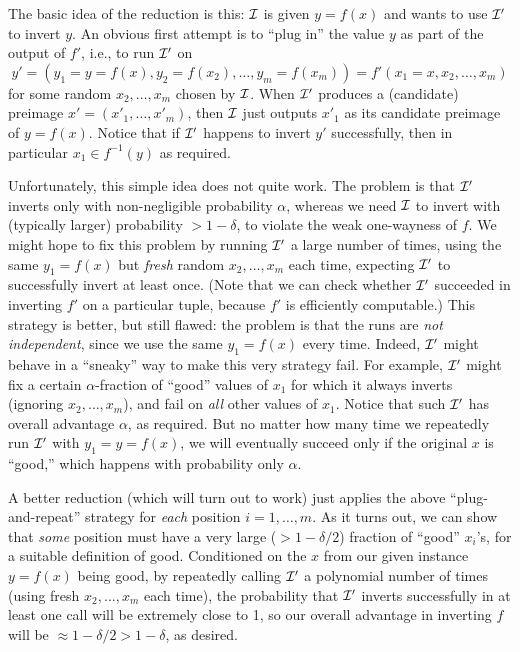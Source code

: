 \documentclass[11pt]{article}
\begin{document}
The basic idea of the reduction is this: $\mathcal{I}$ is given $y = f(x)$
and wants to use $\mathcal{I}'$ to invert $y$.  An obvious first attempt is
to ``plug in'' the value $y$ as part of the output of $f'$, i.e., to
run $\mathcal{I}'$ on \[ y' = (y_{1} = y = f(x), y_{2} = f(x_{2}), \ldots,
y_{m} = f(x_{m})) = f'(x_{1} = x, x_{2}, \ldots, x_{m}) \] for some
random $x_{2}, \ldots, x_{m}$ chosen by $\mathcal{I}$.  When $\mathcal{I}'$ produces
a (candidate) preimage $x'=(x'_{1},\ldots,x'_{m})$, then $\mathcal{I}$ just
outputs $x'_{1}$ as its candidate preimage of $y=f(x)$.  Notice that
if $\mathcal{I}'$ happens to invert $y'$ successfully, then in particular
$x_{1} \in f^{-1}(y)$ as required.

Unfortunately, this simple idea does not quite work.  The problem is
that $\mathcal{I}'$ inverts only with non-negligible probability $\alpha$,
whereas we need $\mathcal{I}$ to invert with (typically larger) probability
$> 1-\delta$, to violate the weak one-wayness of $f$.  We might hope
to fix this problem by running $\mathcal{I}'$ a large number of times, using
the same $y_{1} = f(x)$ but \emph{fresh} random $x_{2}, \ldots, x_{m}$
each time, expecting $\mathcal{I}'$ to successfully invert at least once.
(Note that we can check whether $\mathcal{I}'$ succeeded in inverting $f'$ on
a particular tuple, because $f'$ is efficiently computable.)  This
strategy is better, but still flawed: the problem is that the runs are
\emph{not independent}, since we use the same $y_{1} = f(x)$ every
time.  Indeed, $\mathcal{I}'$ might behave in a ``sneaky'' way to make this
very strategy fail.  For example, $\mathcal{I}'$ might fix a certain
$\alpha$-fraction of ``good'' values of $x_{1}$ for which it always
inverts (ignoring $x_{2}, \ldots, x_{m}$), and fail on \emph{all}
other values of $x_{1}$.  Notice that such $\mathcal{I}'$ has overall
advantage $\alpha$, as required.  But no matter how many time we
repeatedly run $\mathcal{I}'$ with $y_{1}=y=f(x)$, we will eventually succeed
only if the original $x$ is ``good,'' which happens with probability
only $\alpha$.

A better reduction (which will turn out to work) just applies the
above ``plug-and-repeat'' strategy for \emph{each} position $i = 1,
\ldots, m$.  As it turns out, we can show that \emph{some} position
must have a very large ($> 1-\delta/2$) fraction of ``good''
$x_{i}$'s, for a suitable definition of good.  Conditioned on the $x$
from our given instance $y = f(x)$ being good, by repeatedly calling
$\mathcal{I}'$ a polynomial number of times (using fresh $x_{2}, \ldots,
x_{m}$ each time), the probability that $\mathcal{I}'$ inverts successfully
in at least one call will be extremely close to 1, so our overall
advantage in inverting $f$ will be $\approx 1-\delta/2 > 1-\delta$, as
desired.
\end{document}
